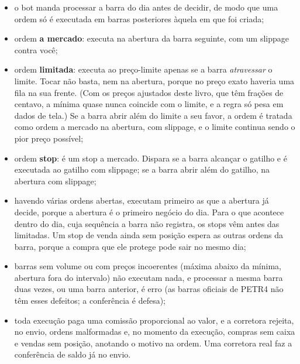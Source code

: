 \begin{itemize}
  \item o bot manda processar a barra do dia antes de decidir, de modo que uma ordem só é executada em barras posteriores àquela em que foi criada;
  \item ordem \textbf{a mercado}: executa na abertura da barra seguinte, com um slippage contra você;
  \item ordem \textbf{limitada}: executa ao preço-limite apenas se a barra \emph{atravessar} o limite. Tocar não basta, nem na abertura, porque no preço exato haveria uma fila na sua frente. (Com os preços ajustados deste livro, que têm frações de centavo, a mínima quase nunca coincide com o limite, e a regra só pesa em dados de tela.) Se a barra abrir além do limite a seu favor, a ordem é tratada como ordem a mercado na abertura, com slippage, e o limite continua sendo o pior preço possível;
  \item ordem \textbf{stop}: é um stop a mercado. Dispara se a barra alcançar o gatilho e é executada ao gatilho com slippage; se a barra abrir além do gatilho, na abertura com slippage;
  \item havendo várias ordens abertas, executam primeiro as que a abertura já decide, porque a abertura é o primeiro negócio do dia. Para o que acontece dentro do dia, cuja sequência a barra não registra, os stops vêm antes das limitadas. Um stop de venda ainda sem posição espera as outras ordens da barra, porque a compra que ele protege pode sair no mesmo dia;
  \item barras sem volume ou com preços incoerentes (máxima abaixo da mínima, abertura fora do intervalo) não executam nada, e processar a mesma barra duas vezes, ou uma barra anterior, é erro (as barras oficiais de PETR4 não têm esses defeitos; a conferência é defesa);
  \item toda execução paga uma comissão proporcional ao valor, e a corretora rejeita, no envio, ordens malformadas e, no momento da execução, compras sem caixa e vendas sem posição, anotando o motivo na ordem. Uma corretora real faz a conferência de saldo já no envio.
\end{itemize}




